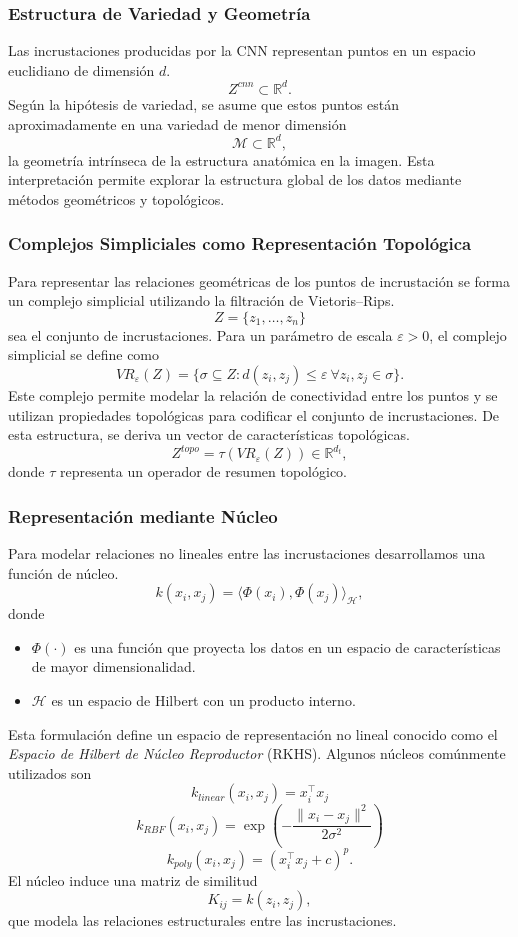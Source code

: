\documentclass[conference]{IEEEtran}
\begin{document}
\subsubsection{Estructura de Variedad y Geometría}
Las incrustaciones producidas por la CNN representan puntos en un espacio euclidiano de dimensión \(d\).
\[Z^{cnn} \subset \mathbb{R}^d.\]
Según la hipótesis de variedad, se asume que estos puntos están aproximadamente en una variedad de menor dimensión
\[\mathcal{M} \subset \mathbb{R}^d,\]
la geometría intrínseca de la estructura anatómica en la imagen. Esta interpretación permite explorar la estructura global de los datos mediante métodos geométricos y topológicos.

\subsubsection{Complejos Simpliciales como Representación Topológica}
Para representar las relaciones geométricas de los puntos de incrustación se forma un complejo simplicial utilizando la filtración de Vietoris--Rips.
\[Z = \{z_1,\dots,z_n\}\]
sea el conjunto de incrustaciones. Para un parámetro de escala \(\varepsilon > 0\), el complejo simplicial se define como
\[VR_\varepsilon(Z) =\{\sigma \subseteq Z :d(z_i,z_j) \le \varepsilon\ \forall z_i,z_j \in \sigma\}.\]
Este complejo permite modelar la relación de conectividad entre los puntos y se utilizan propiedades topológicas para codificar el conjunto de incrustaciones. De esta estructura, se deriva un vector de características topológicas.
\[Z^{topo} = \tau(VR_\varepsilon(Z)) \in \mathbb{R}^{d_t},\]
donde \(\tau\) representa un operador de resumen topológico.

\subsubsection{Representación mediante Núcleo}
Para modelar relaciones no lineales entre las incrustaciones desarrollamos una función de núcleo.
\[k(x_i,x_j) =\langle \Phi(x_i), \Phi(x_j) \rangle_{\mathcal{H}},\]
donde
\begin{itemize}\item \(\Phi(\cdot)\) es una función que proyecta los datos en un espacio de características de mayor dimensionalidad.\item \(\mathcal{H}\) es un espacio de Hilbert con un producto interno.\end{itemize}
Esta formulación define un espacio de representación no lineal conocido como el \emph{Espacio de Hilbert de Núcleo Reproductor} (RKHS). Algunos núcleos comúnmente utilizados son
\[k_{linear}(x_i,x_j) = x_i^\top x_j\]
\[k_{RBF}(x_i,x_j) =\exp\left(-\frac{\|x_i-x_j\|^2}{2\sigma^2}\right)\]
\[k_{poly}(x_i,x_j) =(x_i^\top x_j + c)^p.\]
El núcleo induce una matriz de similitud
\[K_{ij} = k(z_i,z_j),\]
que modela las relaciones estructurales entre las incrustaciones.
\end{document}
